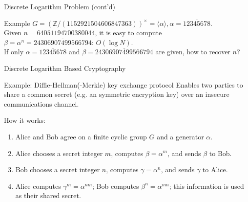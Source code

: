 \documentclass{beamer}
\begin{document}
\begin{frame}{Discrete Logarithm Problem (cont'd)}
\begin{block}{Example}
$G = \left(\mathbb{Z}/(1152921504606847363)\right)^{\times} =
\langle\alpha\rangle, \alpha = \overline{12345678}$. \\
Given $n = 64051194700380044$, it is easy to compute 
$\beta = \alpha^n =
\overline{24306907499566794}$: \quad $O(\log N)$. \\
If only $\alpha = \overline{12345678}$ and $\beta =
\overline{24306907499566794}$ are given, how to recover $n$?
\end{block}
\end{frame}


\begin{frame}{Discrete Logarithm Based Cryptography}

\begin{block}{Example: Diffie-Hellman(-Merkle) key exchange protocol}
    Enables two parties to share a common secret (e.g. an symmetric encryption
key) over an insecure communications channel.

    How it works:
\begin{enumerate}
    \item Alice and Bob agree on a finite cyclic group $G$ and a generator
$\alpha$. 
    \item Alice chooses a secret integer $m$, computes $\beta = \alpha^m$, and
sends $\beta$ to Bob.
    \item Bob chooses a secret integer $n$, computes $\gamma = \alpha^n$, and
sends $\gamma$ to Alice.
    \item Alice computes $\gamma^m = \alpha^{nm}$; Bob computes $\beta^n =
\alpha^{mn}$; this information is used as their shared secret.
\end{enumerate}
\end{block}
\end{frame}
\end{document}
